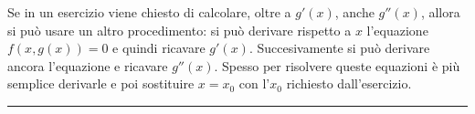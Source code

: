 Se in un esercizio viene chiesto di calcolare, oltre a $g'(x)$, anche $g''(x)$, allora si può usare un altro procedimento: si può derivare rispetto a $x$ l'equazione $f(x, g(x)) = 0$ e quindi ricavare $g'(x)$. Succesivamente si può derivare ancora l'equazione e ricavare $g''(x)$. Spesso per risolvere queste equazioni è più semplice derivarle e poi sostituire $x = x_0$ con l'$x_0$ richiesto dall'esercizio.\newline
\rule{\textwidth}{2pt}